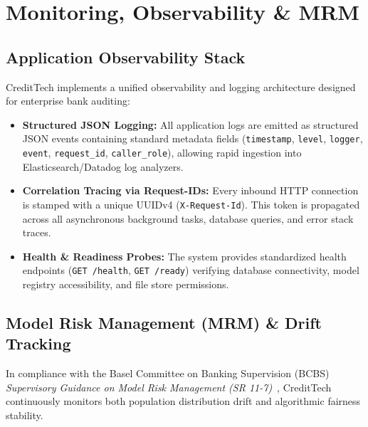 \chapter{Monitoring, Observability \& MRM}
\label{chap:monitoring_mrm}

\section{Application Observability Stack}
CreditTech implements a unified observability and logging architecture designed for enterprise bank auditing:
\begin{itemize}
  \item \textbf{Structured JSON Logging:} All application logs are emitted as structured JSON events containing standard metadata fields (\texttt{timestamp}, \texttt{level}, \texttt{logger}, \texttt{event}, \texttt{request\_id}, \texttt{caller\_role}), allowing rapid ingestion into Elasticsearch/Datadog log analyzers.
  \item \textbf{Correlation Tracing via Request-IDs:} Every inbound HTTP connection is stamped with a unique UUIDv4 (\texttt{X-Request-Id}). This token is propagated across all asynchronous background tasks, database queries, and error stack traces.
  \item \textbf{Health \& Readiness Probes:} The system provides standardized health endpoints (\texttt{GET /health}, \texttt{GET /ready}) verifying database connectivity, model registry accessibility, and file store permissions.
\end{itemize}

\section{Model Risk Management (MRM) \& Drift Tracking}
In compliance with the Basel Committee on Banking Supervision (BCBS) \textit{Supervisory Guidance on Model Risk Management (SR 11-7)}~\cite{bcbs_mrm_2011}, CreditTech continuously monitors both population distribution drift and algorithmic fairness stability.

